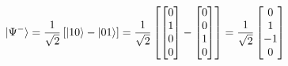\documentclass{article}
\begin{document}
\begin{align*}
\begin{split}
        \ket{\Psi^-} &= \frac{1}{\sqrt{2}}\left[ \ket{10} - \ket{01}\right] = \frac{1}{\sqrt{2}}\left[\begin{bmatrix} 0 \\ 1 \\ 0 \\ 0 \end{bmatrix} - \begin{bmatrix} 0 \\ 0 \\ 1 \\ 0 \end{bmatrix}\right] = \frac{1}{\sqrt{2}}\begin{bmatrix} 0 \\ 1 \\ -1 \\ 0\end{bmatrix}\\
    \end{split}
\end{align*}
\end{document}
